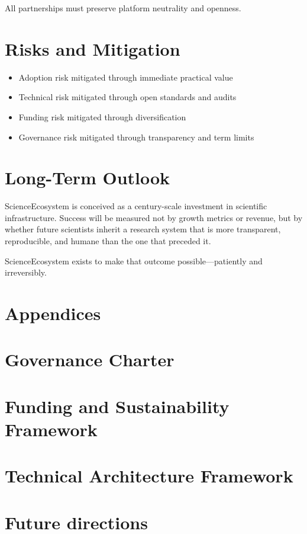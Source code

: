 \documentclass[11pt,a4paper]{article}
\begin{document}
All partnerships must preserve platform neutrality and openness.

\section{Risks and Mitigation}

\begin{itemize}
    \item Adoption risk mitigated through immediate practical value
    \item Technical risk mitigated through open standards and audits
    \item Funding risk mitigated through diversification
    \item Governance risk mitigated through transparency and term limits
\end{itemize}

\section{Long-Term Outlook}

ScienceEcosystem is conceived as a century-scale investment in scientific infrastructure. Success will be measured not by growth metrics or revenue, but by whether future scientists inherit a research system that is more transparent, reproducible, and humane than the one that preceded it.

ScienceEcosystem exists to make that outcome possible—patiently and irreversibly.

\appendix
\clearpage
\section*{Appendices}
\section{Governance Charter}


\clearpage
\section{Funding and Sustainability Framework}


\clearpage
\section{Technical Architecture Framework}


\clearpage
\section{Future directions}

\end{document}
